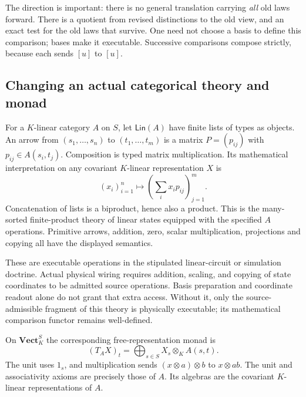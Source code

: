 \documentclass[11pt]{article}
\theoremstyle{definition}
\theoremstyle{remark}\newtheorem{remark}[theorem]{Remark}
\begin{document}
The direction is important: there is no general translation carrying
\emph{all} old laws forward. There is a quotient from revised distinctions
to the old view, and an exact test for the old laws that survive.
One need not choose a basis to define this comparison; bases make it
executable. Successive comparisons compose strictly, because each sends
$[u]$ to $[u]$.

\subsection{Changing an actual categorical theory and monad}

For a $K$-linear category $A$ on $S$, let $\mathsf{Lin}(A)$ have finite
lists of types as objects. An arrow from $(s_1,\ldots,s_n)$ to
$(t_1,\ldots,t_m)$ is a matrix $P=(p_{ij})$ with
$p_{ij}\in A(s_i,t_j)$. Composition is typed matrix multiplication.
Its mathematical interpretation on any covariant $K$-linear representation $X$ is
\begin{equation}\label{ef:eq:term-execution}
             (x_i)_{i=1}^n\longmapsto
             \left(\sum_i x_i p_{ij}\right)_{j=1}^m.
\end{equation}
Concatenation of lists is a biproduct, hence also a product. This is the
many-sorted finite-product theory of linear states equipped with the
specified $A$ operations. Primitive arrows, addition, zero, scalar
multiplication, projections and copying all have the displayed semantics.

These are executable operations in the stipulated linear-circuit or
simulation doctrine. Actual physical wiring requires addition, scaling,
and copying of state coordinates to be admitted source operations.
Basis preparation and coordinate readout alone do not grant that extra
access. Without it, only the source-admissible fragment of this theory
is physically executable; its mathematical comparison functor remains
well-defined.

On $\mathbf{Vect}_K^S$ the corresponding free-representation monad is
\begin{equation}\label{ef:eq:monad}
       (T_A X)_t=\bigoplus_{s\in S}X_s\otimes_K A(s,t).
\end{equation}
The unit uses $1_s$, and multiplication sends
$(x\otimes a)\otimes b$ to $x\otimes ab$. The unit and associativity
axioms are precisely those of $A$. Its algebras are the covariant
$K$-linear representations of $A$.
\end{document}

